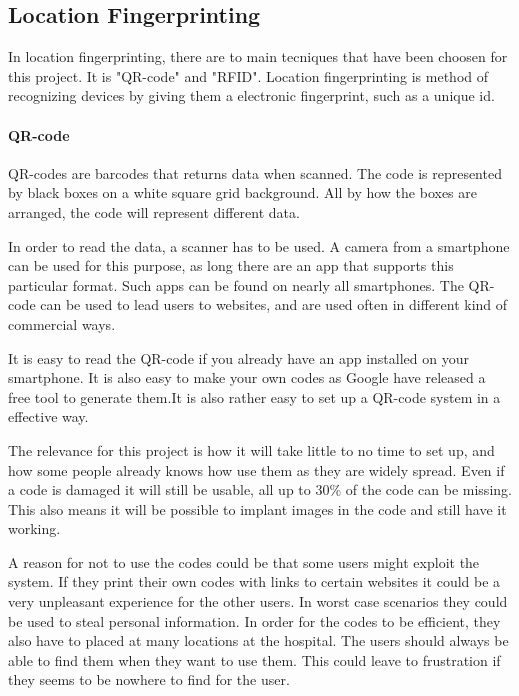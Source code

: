 \subsection{Location Fingerprinting}
In location fingerprinting, there are to main tecniques that have been choosen for this project. It is "QR-code" and "RFID".
Location fingerprinting is method of recognizing devices by giving them a electronic fingerprint, such as a unique id.

\paragraph{QR-code} %
QR-codes are barcodes that returns data when scanned. The code is represented by black boxes on a white square grid background. All by how the boxes are arranged, the code will represent different data.

In order to read the data, a scanner has to be used. A camera from a smartphone can be used for this purpose, as long there are an app that supports this particular format. Such apps can be found on nearly all smartphones\cite{QR_smart}. The QR-code can be used to lead users to websites, and are used often in different kind of commercial ways\cite{QR_url}.

It is easy to read the QR-code if you already have an app installed on your smartphone. It is also easy to make your own codes as Google have released a free tool to generate them\cite{QR_Google}.It is also rather easy to set up a QR-code system in a effective way\cite{QR_easy}.

The relevance for this project is how it will take little to no time to set up\cite{QR_rel1}, and how some people already knows how use them as they are widely spread\cite{QR_spread}. Even if a code is damaged it will still be usable, all up to 30\% of the code can be missing\cite{QR_dama}. This also means it will be possible to implant images in the code and still have it working\cite{QR_image}.

A reason for not to use the codes could be that some users might exploit the system. If they print their own codes with links to certain websites it could be a very unpleasant experience for the other users\cite{QR_urlbad}. In worst case scenarios they could be used to steal personal information\cite{QR_information}.
In order for the codes to be efficient, they also have to placed at many locations at the hospital. The users should always be able to find them when they want to use them. This could leave to frustration if they seems to be nowhere to find for the user.


